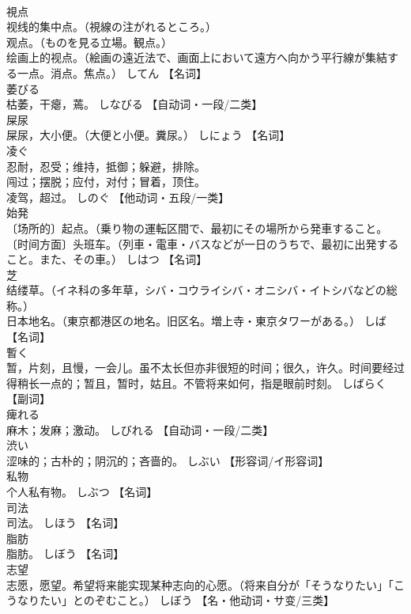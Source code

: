 \documentclass[8pt]{extreport}
\begin{document}
\begin{CJK}{UTF8}{min}
\\	視点	
\\	视线的集中点。（視線の注がれるところ。） 
\\	观点。（ものを見る立場。観点。） 
\\	绘画上的视点。（絵画の遠近法で、画面上において遠方へ向かう平行線が集結する一点。消点。焦点。）	してん		【名词】
\\	萎びる	
\\	枯萎，干瘪，蔫。	しなびる		【自动词・一段/二类】
\\	屎尿	
\\	屎尿，大小便。（大便と小便。糞尿。）	しにょう		【名词】
\\	凌ぐ	
\\	忍耐，忍受；维持，抵御；躲避，排除。 
\\	闯过；摆脱；应付，对付；冒着，顶住。 
\\	凌驾，超过。	しのぐ		【他动词・五段/一类】
\\	始発	
\\	〔场所的〕起点。（乗り物の運転区間で、最初にその場所から発車すること。 
\\	〔时间方面〕头班车。（列車・電車・バスなどが一日のうちで、最初に出発すること。また、その車。）	しはつ		【名词】
\\	芝	
\\	结缕草。（イネ科の多年草，シバ・コウライシバ・オニシバ・イトシバなどの総称。） 
\\	日本地名。（東京都港区の地名。旧区名。増上寺・東京タワーがある。）	しば		【名词】
\\	暫く	
\\	暂，片刻，且慢，一会儿。虽不太长但亦非很短的时间；很久，许久。时间要经过得稍长一点的；暂且，暂时，姑且。不管将来如何，指是眼前时刻。	しばらく		【副词】
\\	痺れる	
\\	麻木；发麻；激动。	しびれる		【自动词・一段/二类】
\\	渋い	
\\	涩味的；古朴的；阴沉的；吝啬的。	しぶい		【形容词/イ形容词】
\\	私物	
\\	个人私有物。	しぶつ		【名词】
\\	司法	
\\	司法。	しほう		【名词】
\\	脂肪	
\\	脂肪。	しぼう		【名词】
\\	志望	
\\	志愿，愿望。希望将来能实现某种志向的心愿。（将来自分が「そうなりたい」「こうなりたい」とのぞむこと。）	しぼう		【名・他动词・サ变/三类】

\end{CJK}
\end{document}

